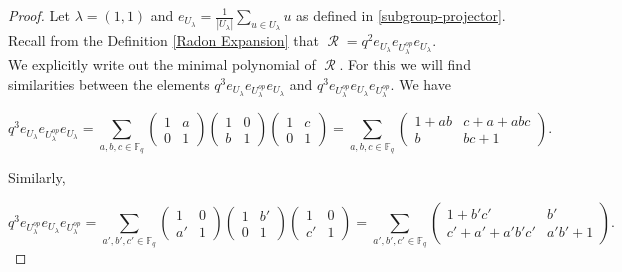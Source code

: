 \documentclass[10pt,a4paper]{amsart}
\DeclareMathOperator{\R}{\mathcal{R}}
\begin{document}
\begin{proof}
Let $\lambda=(1,1)$ and $e_{U_{\lambda}}=\frac{1}{|U_{\lambda}|}\sum_{u \in U_\lambda} u$ as defined in \ref{subgroup-projector}. Recall from the Definition \ref{Radon Expansion} that $\R =q^2 e_{U_{\lambda}}e_{U_{\lambda}^{op}}e_{U_{\lambda}}$.\\


We explicitly write out the minimal polynomial of $\R$. For this we will find similarities between the elements $q^3 e_{U_{\lambda}}e_{U_{\lambda}^{op}}e_{U_{\lambda}}$ and $q^3 e_{U_{\lambda}^{op}}e_{U_{\lambda}}e_{U_{\lambda}^{op}}$. We have

\[q^3 e_{U_{\lambda}}e_{U_{\lambda}^{op}}e_{U_{\lambda}} = \sum_{a, b, c \in \mathbb{F}_q} 
\begin{pmatrix}
1 & a \\
0 & 1 
\end{pmatrix}
\begin{pmatrix}
1 & 0 \\
b & 1 
\end{pmatrix}
\begin{pmatrix}
1 & c \\
0 & 1 
\end{pmatrix}
= \sum_{a, b, c \in \mathbb{F}_q} 
\begin{pmatrix}
1+ab & c+a+abc \\
b & bc+1 
\end{pmatrix}.\]

Similarly,

\[q^3 e_{U_{\lambda}^{op}}e_{U_{\lambda}}e_{U_{\lambda}^{op}} = \sum_{a', b', c' \in \mathbb{F}_q} 
\begin{pmatrix}
1 & 0 \\
a' & 1 
\end{pmatrix}
\begin{pmatrix}
1 & b' \\
0 & 1 
\end{pmatrix}
\begin{pmatrix}
1 & 0 \\
c' & 1 
\end{pmatrix}
= \sum_{a', b', c' \in \mathbb{F}_q} 
\begin{pmatrix}
1+b'c' & b' \\
c'+a'+a'b'c' & a'b'+1 
\end{pmatrix}.\]


\end{proof}
\end{document}
